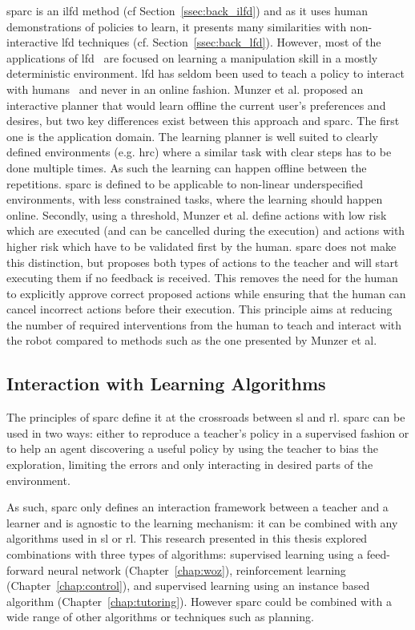 \gls{sparc} is an \gls{ilfd} method (cf Section~\ref{ssec:back_ilfd}) and as it uses human demonstrations of policies to learn, it presents many similarities with non-interactive \gls{lfd} techniques (cf. Section~\ref{ssec:back_lfd}). However, most of the applications of \gls{lfd}~\citep{argall2009survey,billard2008robot} are focused on learning a manipulation skill in a mostly deterministic environment. \gls{lfd} has seldom been used to teach a policy to interact with humans~\citep{liu2014train,sequeira2016discovering,munzer2017efficient} and never in an online fashion. Munzer et al. proposed an interactive planner that would learn offline the current user's preferences and desires, but two key differences exist between this approach and \gls{sparc}. The first one is the application domain. The learning planner is well suited to clearly defined environments (e.g. \gls{hrc}) where a similar task with clear steps has to be done multiple times. As such the learning can happen offline between the repetitions. \gls{sparc} is defined to be applicable to non-linear underspecified environments, with less constrained tasks, where the learning should happen online. Secondly, using a threshold, Munzer et al. define actions with low risk which are executed (and can be cancelled during the execution) and actions with higher risk which have to be validated first by the human. \gls{sparc} does not make this distinction, but proposes both types of actions to the teacher and will start executing them if no feedback is received. This removes the  need for the human to explicitly approve correct proposed actions while ensuring that the human can cancel incorrect actions before their execution. This principle aims at reducing the number of required interventions from the human to teach and interact with the robot compared to methods such as the one presented by Munzer et al. 

\subsection{Interaction with Learning Algorithms}

The principles of \gls{sparc} define it at the crossroads between \gls{sl} and \gls{rl}. \gls{sparc} can be used in two ways: either to reproduce a teacher's policy in a supervised fashion or to help an agent discovering a useful policy by using the teacher to bias the exploration, limiting the errors and only interacting in desired parts of the environment.

As such, \gls{sparc} only defines an interaction framework between a teacher and a learner and is agnostic to the learning mechanism: it can be combined with any algorithms used in \gls{sl} or \gls{rl}. This research presented in this thesis explored combinations with three types of algorithms: supervised learning using a feed-forward neural network (Chapter~\ref{chap:woz}), reinforcement learning (Chapter~\ref{chap:control}), and supervised learning using an instance based algorithm (Chapter~\ref{chap:tutoring}). However \gls{sparc} could be combined with a wide range of other algorithms or techniques such as planning.

